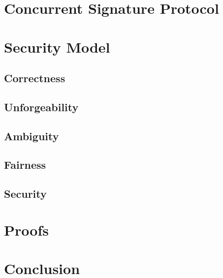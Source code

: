 \documentclass{beamer}
\begin{document}
\section{Concurrent Signature Protocol}


\section{Security Model}


\subsection{Correctness}


\subsection{Unforgeability}


\subsection{Ambiguity}


\subsection{Fairness}


\subsection{Security}


\section{Proofs}


\section{Conclusion}

\end{document}
